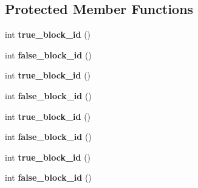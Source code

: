 \subsection*{Protected Member Functions}
\begin{DoxyCompactItemize}
\item 
int {\bfseries true\+\_\+block\+\_\+id} ()\hypertarget{classv8_1_1internal_1_1_l_control_instruction_ad2986a888876b5fa39f611488e23ac89}{}\label{classv8_1_1internal_1_1_l_control_instruction_ad2986a888876b5fa39f611488e23ac89}

\item 
int {\bfseries false\+\_\+block\+\_\+id} ()\hypertarget{classv8_1_1internal_1_1_l_control_instruction_a6a334104d5520b92b05ab201057dd0c9}{}\label{classv8_1_1internal_1_1_l_control_instruction_a6a334104d5520b92b05ab201057dd0c9}

\item 
int {\bfseries true\+\_\+block\+\_\+id} ()\hypertarget{classv8_1_1internal_1_1_l_control_instruction_ad2986a888876b5fa39f611488e23ac89}{}\label{classv8_1_1internal_1_1_l_control_instruction_ad2986a888876b5fa39f611488e23ac89}

\item 
int {\bfseries false\+\_\+block\+\_\+id} ()\hypertarget{classv8_1_1internal_1_1_l_control_instruction_a6a334104d5520b92b05ab201057dd0c9}{}\label{classv8_1_1internal_1_1_l_control_instruction_a6a334104d5520b92b05ab201057dd0c9}

\item 
int {\bfseries true\+\_\+block\+\_\+id} ()\hypertarget{classv8_1_1internal_1_1_l_control_instruction_ad2986a888876b5fa39f611488e23ac89}{}\label{classv8_1_1internal_1_1_l_control_instruction_ad2986a888876b5fa39f611488e23ac89}

\item 
int {\bfseries false\+\_\+block\+\_\+id} ()\hypertarget{classv8_1_1internal_1_1_l_control_instruction_a6a334104d5520b92b05ab201057dd0c9}{}\label{classv8_1_1internal_1_1_l_control_instruction_a6a334104d5520b92b05ab201057dd0c9}

\item 
int {\bfseries true\+\_\+block\+\_\+id} ()\hypertarget{classv8_1_1internal_1_1_l_control_instruction_ad2986a888876b5fa39f611488e23ac89}{}\label{classv8_1_1internal_1_1_l_control_instruction_ad2986a888876b5fa39f611488e23ac89}

\item 
int {\bfseries false\+\_\+block\+\_\+id} ()\hypertarget{classv8_1_1internal_1_1_l_control_instruction_a6a334104d5520b92b05ab201057dd0c9}{}\label{classv8_1_1internal_1_1_l_control_instruction_a6a334104d5520b92b05ab201057dd0c9}


\end{DoxyCompactItemize}
